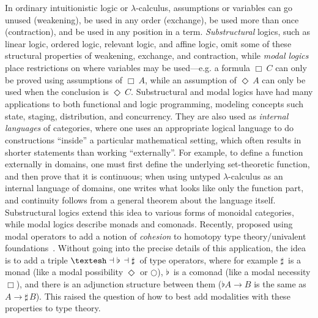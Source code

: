 \documentclass[a4paper,USenglish]{lipics-v2016}
\newcommand\Bx[2]{\ensuremath{\Box_{#1} \, {#2}}}
\newcommand\Dia[2]{\ensuremath{\Diamond_{#1} \, {#2}}}
\newcommand\Flat[1]{\ensuremath{\flat \, {#1}}}
\newcommand\Sharp[1]{\ensuremath{\sharp \, {#1}}}
\newcommand{\sh}{\text{\textesh}}
\newcommand\la\dashv
\newcommand\citep[1]{\cite{#1}}
\newcommand\citet[1]{\cite{#1}}
\begin{document}
In ordinary intuitionistic logic or $\lambda$-calculus, assumptions or
variables can go unused (weakening), be used in any order (exchange), be
used more than once (contraction), and be used in any position in a
term.  \emph{Substructural} logics, such as linear logic, ordered logic,
relevant logic, and affine logic, omit some of these structural
properties of weakening, exchange, and contraction, while \emph{modal
  logics} place restrictions on where variables may be used---e.g. a
formula $\Bx{} C$ can only be proved using assumptions of $\Bx{} A$,
while an assumption of $\Dia{}{A}$ can only be used when the conclusion
is $\Dia{}{C}$.  Substructural and modal logics have had many
applications to both functional and logic programming, modeling concepts
such state, staging, distribution, and concurrency.
They are also used as \emph{internal languages} of categories, where one
uses an appropriate logical language to do constructions ``inside'' a
particular mathematical setting, which often results in shorter
statements than working ``externally''.  For example, to define a
function externally in domains, one must first define the underlying
set-theoretic function, and then prove that it is continuous; when using
untyped $\lambda$-calculus as an internal language of domains, one
writes what looks like only the function part, and continuity follows
from a general theorem about the language itself.  Substructural logics
extend this idea to various forms of monoidal categories, while modal
logics describe monads and comonads.  Recently,
\citet{schreibershulman12cohesive,shulman15realcohesion} proposed using
modal operators to add a notion of \emph{cohesion} to homotopy type
theory/univalent foundations~\citep{voevodsky06homotopy,uf13hott-book}.
Without going into the precise details of this application, the idea is
to add a triple $\sh{} \la \Flat{} \la \Sharp{}$ of type operators,
where for example $\Sharp{}$ is a monad (like a modal possibility
$\Diamond$ or $\bigcirc$), $\Flat{}$ is a comonad (like a modal
necessity $\Box$), and there is an adjunction structure between them
($\flat{A} \to B$ is the same as $A \to \Sharp{B}$).  This raised the
question of how to best add modalities with these properties to type
theory.
\end{document}
